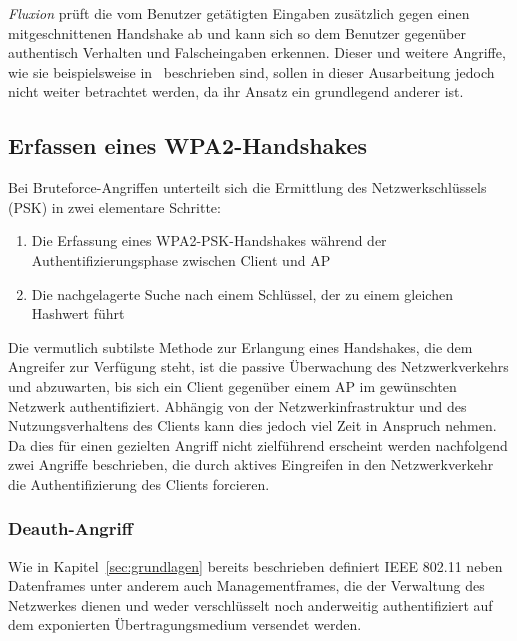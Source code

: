 \textit{Fluxion} prüft die vom Benutzer getätigten Eingaben zusätzlich gegen einen mitgeschnittenen Handshake ab und kann sich so dem Benutzer gegenüber authentisch Verhalten und Falscheingaben erkennen. 
Dieser und weitere Angriffe, wie sie beispielsweise in~\cite{caneill2010attacks} beschrieben sind, sollen in dieser Ausarbeitung jedoch nicht weiter betrachtet werden, da ihr Ansatz ein grundlegend anderer ist.\\

\subsection{Erfassen eines WPA2-Handshakes}
Bei Bruteforce-Angriffen unterteilt sich die Ermittlung des Netzwerkschlüssels (PSK) in zwei elementare Schritte: 
\begin{enumerate}
	\item Die Erfassung eines WPA2-PSK-Handshakes während der Authentifizierungsphase zwischen Client und AP
	\item Die nachgelagerte Suche nach einem Schlüssel, der zu einem gleichen Hashwert führt
\end{enumerate}
Die vermutlich subtilste Methode zur Erlangung eines Handshakes, die dem Angreifer zur Verfügung steht, ist die passive Überwachung des Netzwerkverkehrs und abzuwarten, bis sich ein Client gegenüber einem AP im gewünschten Netzwerk authentifiziert. 
Abhängig von der Netzwerkinfrastruktur und des Nutzungsverhaltens des Clients kann dies jedoch viel Zeit in Anspruch nehmen.
Da dies für einen gezielten Angriff nicht zielführend erscheint werden nachfolgend zwei Angriffe beschrieben, die durch aktives Eingreifen in den Netzwerkverkehr die Authentifizierung des Clients forcieren.

\subsubsection{Deauth-Angriff}\label{subs:deauthentication-attack}
Wie in Kapitel~\ref{sec:grundlagen} bereits beschrieben definiert IEEE 802.11 neben Datenframes unter anderem auch Managementframes, die der Verwaltung des Netzwerkes dienen und weder verschlüsselt noch anderweitig authentifiziert auf dem exponierten Übertragungsmedium versendet werden.

